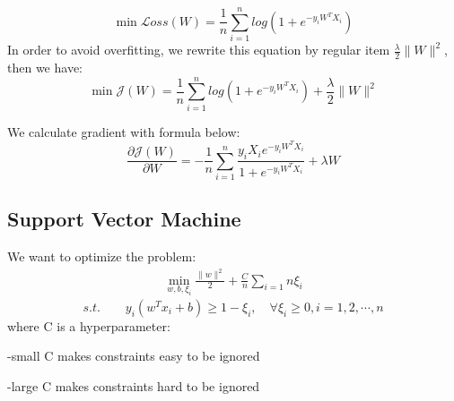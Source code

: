 \documentclass[journal, a4paper]{IEEEtran}
\begin{document}
$$ \min \mathcal{L} oss(W) = \frac{1}{n} \sum_{i=1}^n log(1+e^{-y_i W^T X_i})$$
In order to avoid overfitting, we rewrite this equation by regular item $\frac{\lambda}{2} \parallel W \parallel^2$, then we have:
$$ \min \mathcal{J}(W) = \frac{1}{n} \sum_{i=1}^n log(1+e^{-y_i W^T X_i}) + \frac{\lambda}{2} \parallel W \parallel^2$$ \par

We calculate gradient with formula below:
$$  \frac{\partial \mathcal{J}(W)}{\partial W} = -\frac{1}{n} \sum_{i=1}^n \frac{y_i X_i e^{-y_i W^T X_i}}{1+e^{-y_i W^T X_i}} + \lambda W$$


\subsection{Support Vector Machine}
We want to optimize the problem:
\begin{equation}
	\begin{aligned}
	\nonumber
		\min_{w,b,\xi_i}\frac{\parallel w \parallel^2}{2}+\frac{C}{n}\sum_{i=1}{n}\xi_i
	\end{aligned}
\end{equation}
$$s.t.\quad\quad y_i(w^Tx_i+b)\geq 1-\xi_i, \quad\forall \xi_i\geq0, i=1,2,\cdots ,n$$
where C is a hyperparameter:\\

\centerline{-small C makes constraints easy to be ignored}\centerline{-large C makes constraints hard to be ignored}	
\end{document}
